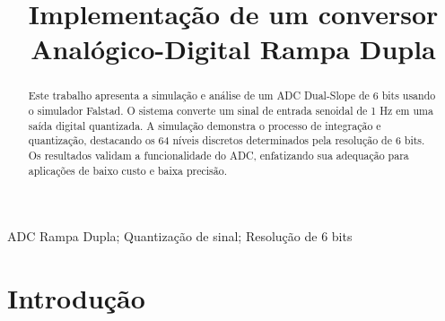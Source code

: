 \documentclass[conference]{IEEEtran}
\begin{document}
\makeatletter
\newcommand{\linebreakand}{%
    \end{@IEEEauthorhalign}
    \hfill\mbox{}\par
    \mbox{}\hfill\begin{@IEEEauthorhalign}
}
\makeatother

\title{Implementação de um conversor Analógico-Digital Rampa Dupla\\
}

\author{
    \and
    \IEEEauthorblockN{}
    \IEEEauthorblockA{}
}

\maketitle

\begin{abstract}
    Este trabalho apresenta a simulação e análise de um ADC Dual-Slope de 6 bits usando o simulador Falstad. O sistema converte um sinal de entrada senoidal de 1 Hz em uma saída digital quantizada. A simulação demonstra o processo de integração e quantização, destacando os 64 níveis discretos determinados pela resolução de 6 bits. Os resultados validam a funcionalidade do ADC, enfatizando sua adequação para aplicações de baixo custo e baixa precisão.
\end{abstract}

\begin{IEEEkeywords}
    ADC Rampa Dupla; Quantização de sinal; Resolução de 6 bits
\end{IEEEkeywords}

\section{Introdução}

\end{document}
